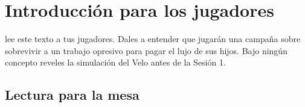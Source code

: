 \chapter{Introducción para los jugadores}

\begin{CajaSecreto}
 lee este texto a tus jugadores. Dales a entender que jugarán una campaña sobre sobrevivir a un trabajo opresivo para pagar el lujo de sus hijos. Bajo ningún concepto reveles la simulación del Velo antes de la Sesión 1.
\end{CajaSecreto}

\section{Lectura para la mesa}


